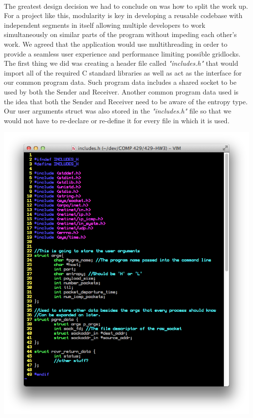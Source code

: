 \documentclass[11pt]{article}
\begin{document}
\paragraph{} The greatest design decision we had to conclude on was how to split the work up. For a project like this, modularity is key in developing a reusable codebase with independent segments in itself allowing multiple developers to work simultaneously on similar parts of the program without impeding each other's work. We agreed that the application would use multithreading in order to provide a seamless user experience and performance limiting possible gridlocks. The first thing we did was creating a header file called \textit{"includes.h"} that would import all of the required C standard libraries as well as act as the interface for our common program data. Such program data includes a shared socket to be used by both the Sender and Receiver. Another common program data used is the idea that both the Sender and Receiver need to be aware of the entropy type.  Our user arguments struct was also stored in the \textit{"includes.h"} file so that we would not have to re-declare or re-define it for every file in which it is used.
\begin{center}
\includegraphics[scale=0.4]{images/includes-header.png}
\end{center}
\end{document}
